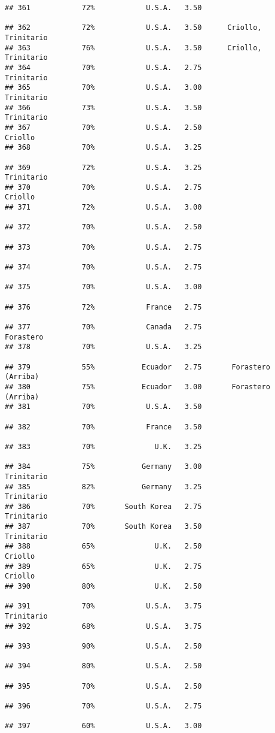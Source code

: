 \documentclass[
]{article}
\begin{document}
\begin{verbatim}
## 361            72%            U.S.A.   3.50                         
## 362            72%            U.S.A.   3.50      Criollo, Trinitario
## 363            76%            U.S.A.   3.50      Criollo, Trinitario
## 364            70%            U.S.A.   2.75               Trinitario
## 365            70%            U.S.A.   3.00               Trinitario
## 366            73%            U.S.A.   3.50               Trinitario
## 367            70%            U.S.A.   2.50                  Criollo
## 368            70%            U.S.A.   3.25                         
## 369            72%            U.S.A.   3.25               Trinitario
## 370            70%            U.S.A.   2.75                  Criollo
## 371            72%            U.S.A.   3.00                         
## 372            70%            U.S.A.   2.50                         
## 373            70%            U.S.A.   2.75                         
## 374            70%            U.S.A.   2.75                         
## 375            70%            U.S.A.   3.00                         
## 376            72%            France   2.75                         
## 377            70%            Canada   2.75                Forastero
## 378            70%            U.S.A.   3.25                         
## 379            55%           Ecuador   2.75       Forastero (Arriba)
## 380            75%           Ecuador   3.00       Forastero (Arriba)
## 381            70%            U.S.A.   3.50                         
## 382            70%            France   3.50                         
## 383            70%              U.K.   3.25                         
## 384            75%           Germany   3.00               Trinitario
## 385            82%           Germany   3.25               Trinitario
## 386            70%       South Korea   2.75               Trinitario
## 387            70%       South Korea   3.50               Trinitario
## 388            65%              U.K.   2.50                  Criollo
## 389            65%              U.K.   2.75                  Criollo
## 390            80%              U.K.   2.50                         
## 391            70%            U.S.A.   3.75               Trinitario
## 392            68%            U.S.A.   3.75                         
## 393            90%            U.S.A.   2.50                         
## 394            80%            U.S.A.   2.50                         
## 395            70%            U.S.A.   2.50                         
## 396            70%            U.S.A.   2.75                         
## 397            60%            U.S.A.   3.00                         

\end{verbatim}
\end{document}
